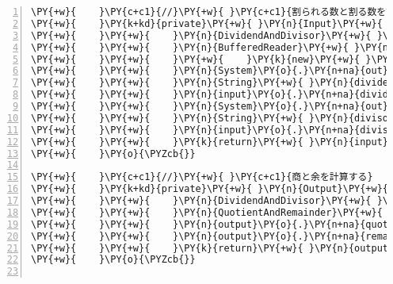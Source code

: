 \begin{Verbatim}[commandchars=\\\{\},numbers=left,firstnumber=1,stepnumber=1,frame=single,fontsize=\small]
\PY{+w}{    }\PY{c+c1}{//}\PY{+w}{ }\PY{c+c1}{割られる数と割る数を読み込む}
\PY{+w}{    }\PY{k+kd}{private}\PY{+w}{ }\PY{n}{Input}\PY{+w}{ }\PY{n+nf}{input}\PY{o}{(}\PY{o}{)}\PY{+w}{ }\PY{k+kd}{throws}\PY{+w}{ }\PY{n}{IOException}\PY{+w}{ }\PY{o}{\PYZob{}}
\PY{+w}{    }\PY{+w}{    }\PY{n}{DividendAndDivisor}\PY{+w}{ }\PY{n}{input}\PY{+w}{ }\PY{o}{=}\PY{+w}{ }\PY{k}{new}\PY{+w}{ }\PY{n}{DividendAndDivisor}\PY{o}{(}\PY{o}{)}\PY{o}{;}
\PY{+w}{    }\PY{+w}{    }\PY{n}{BufferedReader}\PY{+w}{ }\PY{n}{reader}\PY{+w}{ }\PY{o}{=}
\PY{+w}{    }\PY{+w}{    }\PY{+w}{    }\PY{k}{new}\PY{+w}{ }\PY{n+nf}{BufferedReader}\PY{o}{(}\PY{k}{new}\PY{+w}{ }\PY{n}{InputStreamReader}\PY{o}{(}\PY{n}{System}\PY{o}{.}\PY{n+na}{in}\PY{o}{)}\PY{o}{)}\PY{o}{;}
\PY{+w}{    }\PY{+w}{    }\PY{n}{System}\PY{o}{.}\PY{n+na}{out}\PY{o}{.}\PY{n+na}{print}\PY{o}{(}\PY{l+s}{"割られる数を入力してください："}\PY{o}{)}\PY{o}{;}
\PY{+w}{    }\PY{+w}{    }\PY{n}{String}\PY{+w}{ }\PY{n}{dividendString}\PY{+w}{ }\PY{o}{=}\PY{+w}{ }\PY{n}{reader}\PY{o}{.}\PY{n+na}{readLine}\PY{o}{(}\PY{o}{)}\PY{o}{;}
\PY{+w}{    }\PY{+w}{    }\PY{n}{input}\PY{o}{.}\PY{n+na}{dividend}\PY{+w}{ }\PY{o}{=}\PY{+w}{ }\PY{n}{Integer}\PY{o}{.}\PY{n+na}{parseInt}\PY{o}{(}\PY{n}{dividendString}\PY{o}{)}\PY{o}{;}
\PY{+w}{    }\PY{+w}{    }\PY{n}{System}\PY{o}{.}\PY{n+na}{out}\PY{o}{.}\PY{n+na}{print}\PY{o}{(}\PY{l+s}{"割る数を入力してください："}\PY{o}{)}\PY{o}{;}
\PY{+w}{    }\PY{+w}{    }\PY{n}{String}\PY{+w}{ }\PY{n}{divisorString}\PY{+w}{ }\PY{o}{=}\PY{+w}{ }\PY{n}{reader}\PY{o}{.}\PY{n+na}{readLine}\PY{o}{(}\PY{o}{)}\PY{o}{;}
\PY{+w}{    }\PY{+w}{    }\PY{n}{input}\PY{o}{.}\PY{n+na}{divisor}\PY{+w}{ }\PY{o}{=}\PY{+w}{ }\PY{n}{Integer}\PY{o}{.}\PY{n+na}{parseInt}\PY{o}{(}\PY{n}{divisorString}\PY{o}{)}\PY{o}{;}
\PY{+w}{    }\PY{+w}{    }\PY{k}{return}\PY{+w}{ }\PY{n}{input}\PY{o}{;}
\PY{+w}{    }\PY{o}{\PYZcb{}}

\PY{+w}{    }\PY{c+c1}{//}\PY{+w}{ }\PY{c+c1}{商と余を計算する}
\PY{+w}{    }\PY{k+kd}{private}\PY{+w}{ }\PY{n}{Output}\PY{+w}{ }\PY{n+nf}{process}\PY{o}{(}\PY{n}{Input}\PY{+w}{ }\PY{n}{input}\PY{o}{)}\PY{+w}{ }\PY{o}{\PYZob{}}
\PY{+w}{    }\PY{+w}{    }\PY{n}{DividendAndDivisor}\PY{+w}{ }\PY{n}{dad}\PY{+w}{ }\PY{o}{=}\PY{+w}{ }\PY{o}{(}\PY{n}{DividendAndDivisor}\PY{o}{)}\PY{+w}{ }\PY{n}{input}\PY{o}{;}
\PY{+w}{    }\PY{+w}{    }\PY{n}{QuotientAndRemainder}\PY{+w}{ }\PY{n}{output}\PY{+w}{ }\PY{o}{=}\PY{+w}{ }\PY{k}{new}\PY{+w}{ }\PY{n}{QuotientAndRemainder}\PY{o}{(}\PY{o}{)}\PY{o}{;}
\PY{+w}{    }\PY{+w}{    }\PY{n}{output}\PY{o}{.}\PY{n+na}{quotient}\PY{+w}{ }\PY{o}{=}\PY{+w}{ }\PY{n}{dad}\PY{o}{.}\PY{n+na}{dividend}\PY{+w}{ }\PY{o}{/}\PY{+w}{ }\PY{n}{dad}\PY{o}{.}\PY{n+na}{divisor}\PY{o}{;}
\PY{+w}{    }\PY{+w}{    }\PY{n}{output}\PY{o}{.}\PY{n+na}{remainder}\PY{+w}{ }\PY{o}{=}\PY{+w}{ }\PY{n}{dad}\PY{o}{.}\PY{n+na}{dividend}\PY{+w}{ }\PY{o}{\PYZpc{}}\PY{+w}{ }\PY{n}{dad}\PY{o}{.}\PY{n+na}{divisor}\PY{o}{;}
\PY{+w}{    }\PY{+w}{    }\PY{k}{return}\PY{+w}{ }\PY{n}{output}\PY{o}{;}
\PY{+w}{    }\PY{o}{\PYZcb{}}


\end{Verbatim}
